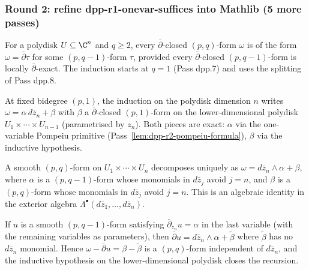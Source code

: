 \subsubsection*{Round 2: refine dpp-r1-onevar-suffices into Mathlib (5 more passes)}

\begin{lemma}
\label{lem:dpp-r6}
For a polydisk $U \subseteq \C^{n}$ and $q \geq 2$, every $\bar\partial$-closed $(p,q)$-form $\omega$ is of the form $\omega = \bar\partial \tau$ for some $(p, q-1)$-form $\tau$, provided every $\bar\partial$-closed $(p,q-1)$-form is locally $\bar\partial$-exact.  The induction starts at $q = 1$ (Pass dpp.7) and uses the splitting of Pass dpp.8.
\leanok
\end{lemma}

\begin{lemma}[Pass dpp.7: induction on $n$ at $q = 1$]
\label{lem:dpp-r7}
At fixed bidegree $(p, 1)$, the induction on the polydisk dimension $n$ writes $\omega = \alpha \, d\bar z_{n} + \beta$ with $\beta$ a $\bar\partial$-closed $(p,1)$-form on the lower-dimensional polydisk $U_{1} \times \cdots \times U_{n-1}$ (parametrised by $z_{n}$).  Both pieces are exact: $\alpha$ via the one-variable Pompeiu primitive (Pass~\ref{lem:dpp-r2-pompeiu-formula}), $\beta$ via the inductive hypothesis.
\leanok
\end{lemma}

\begin{lemma}
\label{lem:dpp-r8}
A smooth $(p,q)$-form on $U_{1} \times \cdots \times U_{n}$ decomposes uniquely as $\omega = d\bar z_{n} \wedge \alpha + \beta$, where $\alpha$ is a $(p, q-1)$-form whose monomials in $d\bar z_{j}$ avoid $j = n$, and $\beta$ is a $(p, q)$-form whose monomials in $d\bar z_{j}$ avoid $j = n$.  This is an algebraic identity in the exterior algebra $\Lambda^{\bullet}(d\bar z_{1}, \ldots, d\bar z_{n})$.
\leanok
\end{lemma}

\begin{lemma}
\label{lem:dpp-r9}
If $u$ is a smooth $(p, q-1)$-form satisfying $\bar\partial_{z_{n}} u = \alpha$ in the last variable (with the remaining variables as parameters), then $\bar\partial u = d\bar z_{n} \wedge \alpha + \tilde\beta$ where $\tilde\beta$ has no $d\bar z_{n}$ monomial.  Hence $\omega - \bar\partial u = \beta - \tilde\beta$ is a $(p,q)$-form independent of $d\bar z_{n}$, and the inductive hypothesis on the lower-dimensional polydisk closes the recursion.
\leanok
\end{lemma}

